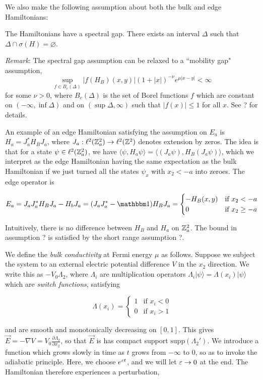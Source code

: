 \documentclass[12pt, letterpaper]{article}
\begin{document}
We also make the following assumption about both the bulk and edge Hamiltonians:

\begin{assumption}
The Hamiltonians have a spectral gap. There exists an interval $\Delta$ such that $\Delta \cap \sigma(H) = \varnothing$.
\end{assumption}

\textit{Remark}: The spectral gap assumption can be relaxed to a ``mobility gap" assumption,
\[\sup_{f \in B_c(\Delta)}|f(H_B)(x,y)|(1+|x|)^{-\nu}e^{\mu|x-y|} < \infty\]
for some $\nu>0$, where $B_c(\Delta)$ is the set of Borel functions $f$ which are constant on $(-\infty,\inf \Delta)$ and on $(\sup \Delta, \infty)$ such that $|f(x)| \leq 1$ for all $x$. See ? for details.

An example of an edge Hamiltonian satisfying the assumption on $E_a$ is $H_a = J_a^*H_BJ_a$, where $J_a:\ell^2(\mathbb{Z}^2_a)\to\ell^2(\mathbb{Z}^2)$ denotes extension by zeros. The idea is that for a state $\psi \in \ell^2(\mathbb{Z}^2_a)$, we have $\langle \psi, H_a \psi \rangle = \langle (J_a \psi), H_B (J_a\psi) \rangle$, which we interpret as the edge Hamiltonian having the same expectation as the bulk Hamiltonian if we just turned all the states $\psi_x$ with $x_2<-a$ into zeroes.  The edge operator is 

\[E_a = J_aJ_a^*H_BJ_a - H_bJ_a = (J_aJ_a^*-\One)H_BJ_a = \begin{cases} -H_B(x,y) & \text{if } x_2 < -a \\ 0 & \text{if } x_2\geq -a\end{cases}\]

Intuitively, there is no difference between $H_B$ and $H_a$ on $\mathbb{Z}^2_a$. The bound in assumption ? is satisfied by the short range assumption ?.

We define the \textit{bulk conductivity} at Fermi energy $\mu$ as follows. Suppose we subject the system to an external electric potential difference $V$ in the $x_2$ direction. We write this as $-V_0 \Lambda_2$, where $\Lambda_i$ are multiplication operators $\Lambda_i |\psi\rangle = \Lambda(x_i)|\psi\rangle$ which are \textit{switch functions}, satisfying

\[\Lambda(x_i) = \begin{cases} 1 & \text{if } x_i<0 \\ 0 & \text{if } x_i > 1\end{cases}\]

and are smooth and monotonically decreasing on $[0,1]$. This gives $\vec{E}=-\nabla V = V_0\frac{\partial \Lambda_2}{\partial x_2}$, so that $\vec{E}$ is has compact support $\text{supp}(\Lambda_2')$. We introduce a function which grows slowly in time as $t$ grows from $-\infty$ to 0, so as to invoke the adiabatic principle. Here, we choose $e^{\varepsilon t}$, and we will let $\varepsilon\to 0$ at the end. The Hamiltonian therefore experiences a perturbation, 
\end{document}
